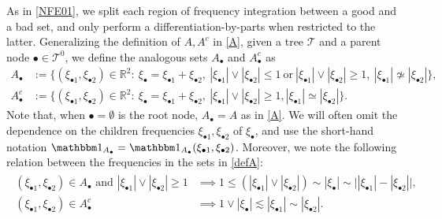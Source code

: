 \documentclass[a4paper,
11pt,  reqno]{amsart}
\newcommand{\5}{\textup{V}}
\newcommand{\noi}{\noindent}
\newcommand{\ind}{\mathbbm 1}
\newcommand{\les}{\lesssim}
\theoremstyle{remark}
\newcommand{\R}{\mathbb{R}}
\newcommand{\bul}{\bullet}
\newcommand{\TT}{\mathcal{T}}
\numberwithin{equation}{section}
\numberwithin{theorem}{section}
\begin{document}
\noi
As in \eqref{NFE01}, we split each region of frequency integration between a good and a bad set, and only perform a differentiation-by-parts when restricted to the latter. Generalizing the definition of $A, A^c$ in \eqref{A}, given a tree $\TT$ and a parent node $\bul \in \TT^0$, we define the analogous sets $A_\bul$ and $A_\bul^c$ as
\begin{align}
A_\bul& 
:=
 \big\{ (\xi_{\bul1}, \xi_{\bul2}) \in \R^2: \ \xi_\bul =
\xi_{\bul1}
+ \xi_{\bul2}, \ |\xi_{\bul1}| \lor  |\xi_{\bul2}|  \le 1 
\ \text{or}
\ |\xi_{\bul1}| \lor |\xi_{\bul2}| \ge 1,\
|\xi_{\bul1} | \not \simeq |\xi_{\bul2}| 
 \big\} , \\
A_\bul^c & := \big\{ (\xi_{\bul1}, \xi_{\bul2}) \in \R^2: \ \xi_\bul =
\xi_{\bul1} +
\xi_{\bul2},\
|\xi_{\bul1}| \lor |\xi_{\bul2}| \ge1
 , |\xi_{\bul1} |  \simeq |\xi_{\bul2}| 
\big\} 
.
\label{defA}
\end{align}
Note that, when $\bul = \emptyset$ is the root node, $A_\bul =A$ as in \eqref{A}. 
We will often omit the dependence on the children frequencies $\xi_{\bul 1}, \xi_{\bul2}$ of $\xi_\bul$, and use the short-hand notation $\ind_{A_\bul}=\ind_{A_\bul} (\xi_{\bul1},\xi_{\bul2})$.
Moreover, we note the following relation between the frequencies in the sets in \eqref{defA}:
\begin{align}
\label{defA2}
\begin{split}
(\xi_{\bul1}, \xi_{\bul2}) \in A_\bul \text{ and } 
|\xi_{\bul1}| \lor |\xi_{\bul2}| \ge 1
&
\implies 1 \le (|\xi_{\bul1}| \lor |\xi_{\bul2}|) \sim |\xi_\bul| \sim \big| | \xi_{\bul1}| - |\xi_{\bul2}| \big|
,
\\
(\xi_{\bul1}, \xi_{\bul2}) \in A_\bul^{c} 
&
\implies 1 \lor  |\xi_{\bul}|  \les |\xi_{\bul1}| \sim |\xi_{\bul2}|
.
\end{split}
\end{align}
\end{document}
